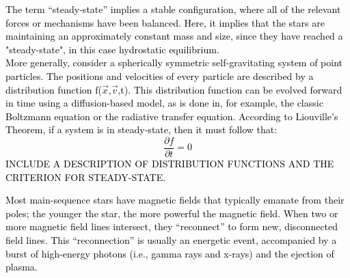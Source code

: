 \documentclass[main.tex]{subfiles}
\begin{document}
\begin{tcolorbox}[sharp corners, colback=blue!30, colframe=blue!80!blue, title=Box \refstepcounter{educhap1}\label{boxchap1:ss}\ref{boxchap1:ss} -- Steady State]
\par \textcolor{black} {The term ``steady-state'' implies a stable configuration, where all of the relevant forces or mechanisms have been balanced.  Here, it implies that the stars are maintaining an approximately constant mass and size, since they have reached a "steady-state", in this case hydrostatic equilibrium. \\
More generally, consider a spherically symmetric self-gravitating system of point particles.  The positions and velocities of every particle are described by a distribution function f($\vec{x}$,$\vec{v}$,t).  This distribution function can be evolved forward in time using a diffusion-based model, as is done in, for example, the classic Boltzmann equation or the radiative transfer equation.  According to Liouville's Theorem, if a system is in steady-state, then it must follow that:
\begin{equation}
\label{eqn:steadystate}
\frac{{\partial}f}{{\partial}t} = 0
\end{equation}
INCLUDE A DESCRIPTION OF DISTRIBUTION FUNCTIONS AND THE CRITERION FOR STEADY-STATE.} 
\end{tcolorbox}

\begin{tcolorbox}[sharp corners, colback=red!30, colframe=red!80!blue, title=Box \refstepcounter{educhap1}\label{boxchap1:rec}\ref{boxchap1:rec} -- Reconnection of Magnetic Field Lines]
\par \textcolor{black} {Most main-sequence stars have magnetic fields that typically emanate from their poles; the younger the star, the more powerful the magnetic field.  When two or more magnetic field lines intersect, they ``reconnect'' to form new, disconnected field lines.  This ``reconnection'' is usually an energetic event, accompanied by a burst of high-energy photons (i.e., gamma rays and x-rays) and the ejection of plasma.}   
\end{tcolorbox}
\end{document}
